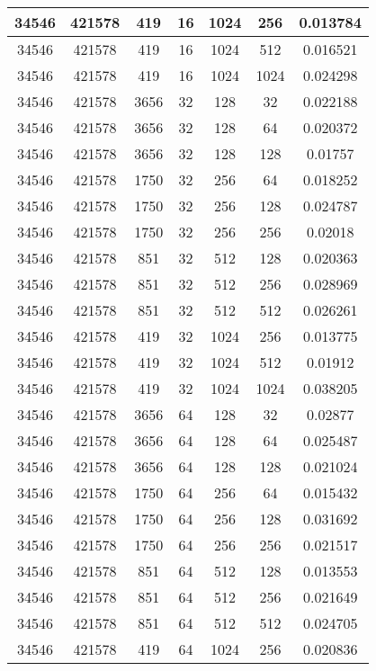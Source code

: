 \documentclass[9pt]{article}
\begin{document}
\begin{tabular}{|c|c|c|c|c|c|c| }
\hline
34546  & 421578  & 419  & 16  & 1024  & 256  & 0.013784 \\
\hline
34546  & 421578  & 419  & 16  & 1024  & 512  & 0.016521 \\
\hline
34546  & 421578  & 419  & 16  & 1024  & 1024  & 0.024298 \\
\hline
34546  & 421578  & 3656  & 32  & 128  & 32  & 0.022188 \\
\hline
34546  & 421578  & 3656  & 32  & 128  & 64  & 0.020372 \\
\hline
34546  & 421578  & 3656  & 32  & 128  & 128  & 0.01757 \\
\hline
34546  & 421578  & 1750  & 32  & 256  & 64  & 0.018252 \\
\hline
34546  & 421578  & 1750  & 32  & 256  & 128  & 0.024787 \\
\hline
34546  & 421578  & 1750  & 32  & 256  & 256  & 0.02018 \\
\hline
34546  & 421578  & 851  & 32  & 512  & 128  & 0.020363 \\
\hline
34546  & 421578  & 851  & 32  & 512  & 256  & 0.028969 \\
\hline
34546  & 421578  & 851  & 32  & 512  & 512  & 0.026261 \\
\hline
34546  & 421578  & 419  & 32  & 1024  & 256  & 0.013775 \\
\hline
34546  & 421578  & 419  & 32  & 1024  & 512  & 0.01912 \\
\hline
34546  & 421578  & 419  & 32  & 1024  & 1024  & 0.038205 \\
\hline
34546  & 421578  & 3656  & 64  & 128  & 32  & 0.02877 \\
\hline
34546  & 421578  & 3656  & 64  & 128  & 64  & 0.025487 \\
\hline
34546  & 421578  & 3656  & 64  & 128  & 128  & 0.021024 \\
\hline
34546  & 421578  & 1750  & 64  & 256  & 64  & 0.015432 \\
\hline
34546  & 421578  & 1750  & 64  & 256  & 128  & 0.031692 \\
\hline
34546  & 421578  & 1750  & 64  & 256  & 256  & 0.021517 \\
\hline
34546  & 421578  & 851  & 64  & 512  & 128  & 0.013553 \\
\hline
34546  & 421578  & 851  & 64  & 512  & 256  & 0.021649 \\
\hline
34546  & 421578  & 851  & 64  & 512  & 512  & 0.024705 \\
\hline
34546  & 421578  & 419  & 64  & 1024  & 256  & 0.020836 \\

\end{tabular}
\end{document}
